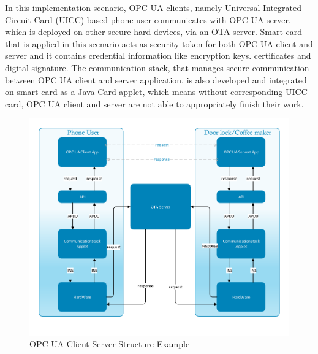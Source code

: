 \documentclass[]{llncs}
\begin{document}
In this implementation scenario, OPC UA clients, namely Universal Integrated Circuit Card (UICC)  based phone user communicates with OPC UA server, which is deployed on other secure hard devices, via an OTA server.   Smart card that is applied in this scenario acts as security token for both OPC UA client and server and it contains credential information like encryption keys. certificates and digital signature. The communication stack, that manages secure  communication between OPC UA client and server application, is also developed and integrated on smart card as a Java Card applet, which means without corresponding UICC card, OPC UA client and server are not able to appropriately finish their work.
 \begin{figure}[ht]

	\centering
	\includegraphics[width=1.1\textwidth]{csoverview}
		\caption[ ]{OPC UA Client Server Structure Example}
	\label{fig:softwareStructure}
\end{figure}
\end{document}
